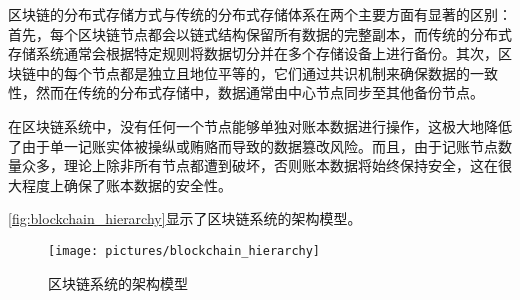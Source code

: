 区块链的分布式存储方式与传统的分布式存储体系在两个主要方面有显著的区别：首先，每个区块链节点都会以链式结构保留所有数据的完整副本，而传统的分布式存储系统通常会根据特定规则将数据切分并在多个存储设备上进行备份。其次，区块链中的每个节点都是独立且地位平等的，它们通过共识机制来确保数据的一致性，然而在传统的分布式存储中，数据通常由中心节点同步至其他备份节点。

在区块链系统中，没有任何一个节点能够单独对账本数据进行操作，这极大地降低了由于单一记账实体被操纵或贿赂而导致的数据篡改风险。而且，由于记账节点数量众多，理论上除非所有节点都遭到破坏，否则账本数据将始终保持安全，这在很大程度上确保了账本数据的安全性。

\autoref{fig:blockchain_hierarchy}显示了区块链系统的架构模型。
\begin{figure}[htbp]
    \centering
    \texttt{[image: pictures/blockchain\_hierarchy]}
    \caption{\label{fig:blockchain_hierarchy}区块链系统的架构模型}
\end{figure}
